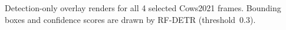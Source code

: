 \caption{Detection-only overlay renders for all 4 selected Cows2021 frames. Bounding boxes and confidence scores are drawn by RF-DETR (threshold~0.3).}\label{fig:detection-gallery-cows2021}
